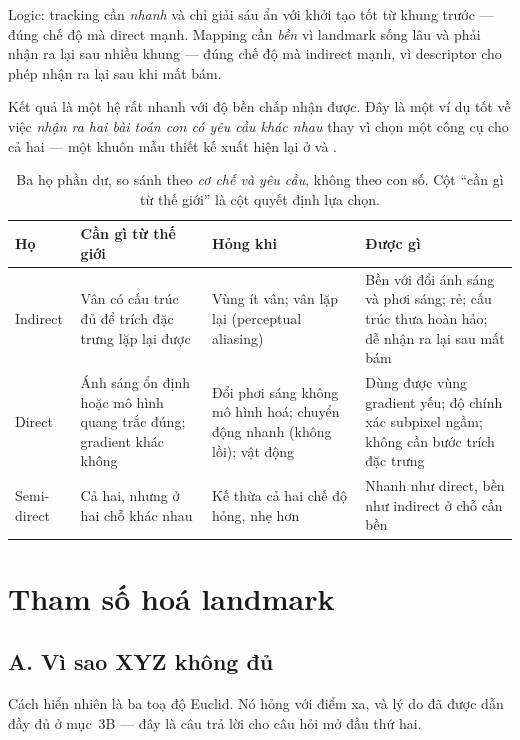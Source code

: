 \documentclass[../../vslam.tex]{subfiles}
\begin{document}
Logic: tracking cần \emph{nhanh} và chỉ giải sáu ẩn với khởi tạo tốt từ khung trước --- đúng chế độ mà direct mạnh. Mapping cần \emph{bền} vì landmark sống lâu và phải nhận ra lại sau nhiều khung --- đúng chế độ mà indirect mạnh, vì descriptor cho phép nhận ra lại sau khi mất bám.

Kết quả là một hệ rất nhanh với độ bền chấp nhận được. Đây là một ví dụ tốt về việc \emph{nhận ra hai bài toán con có yêu cầu khác nhau} thay vì chọn một công cụ cho cả hai --- một khuôn mẫu thiết kế xuất hiện lại ở  và .

\begin{table}[H]\centering\small
\caption{Ba họ phần dư, so sánh theo \emph{cơ chế và yêu cầu}, không theo con số. Cột ``cần gì từ thế giới'' là cột quyết định lựa chọn.}
\label{tab:b08-residual}
\begin{tabularx}{\linewidth}{@{}L{1.9cm}L{2.6cm}L{3.4cm}Y@{}}
\toprule
\textbf{Họ} & \textbf{Cần gì từ thế giới} & \textbf{Hỏng khi} & \textbf{Được gì}\\
\midrule
Indirect & Vân có cấu trúc đủ để trích đặc trưng lặp lại được & Vùng ít vân; vân lặp lại (perceptual aliasing) & Bền với đổi ánh sáng và phơi sáng; rẻ; cấu trúc thưa hoàn hảo; dễ nhận ra lại sau mất bám\\
Direct & Ánh sáng ổn định hoặc mô hình quang trắc đúng; gradient khác không & Đổi phơi sáng không mô hình hoá; chuyển động nhanh (không lồi); vật động & Dùng được vùng gradient yếu; độ chính xác subpixel ngầm; không cần bước trích đặc trưng\\
Semi-direct & Cả hai, nhưng ở hai chỗ khác nhau & Kế thừa cả hai chế độ hỏng, nhẹ hơn & Nhanh như direct, bền như indirect ở chỗ cần bền\\
\bottomrule
\end{tabularx}
\end{table}

\section{Tham số hoá landmark}

\subsection{A. Vì sao XYZ không đủ}

Cách hiển nhiên là ba toạ độ Euclid. Nó hỏng với điểm xa, và lý do đã được dẫn đầy đủ ở  mục~3B --- đây là câu trả lời cho câu hỏi mở đầu thứ hai.
\end{document}
